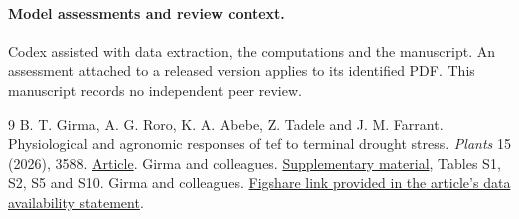 \documentclass[11pt]{article}
\begin{document}
\paragraph{Model assessments and review context.} Codex assisted with data extraction, the computations and the manuscript. An assessment attached to a released version applies to its identified PDF. This manuscript records no independent peer review.

\begin{thebibliography}{9}
 B. T. Girma, A. G. Roro, K. A. Abebe, Z. Tadele and J. M. Farrant. Physiological and agronomic responses of tef to terminal drought stress. \emph{Plants} 15 (2026), 3588. \href{https://doi.org/10.3390/plants15223588}{Article}.
 Girma and colleagues. \href{https://mdpi-res.com/d_attachment/plants/plants-15-03588/article_deploy/plants-15-03588-s001.zip}{Supplementary material}, Tables S1, S2, S5 and S10.
 Girma and colleagues. \href{https://figshare.com/s/0568883f232686727719}{Figshare link provided in the article's data availability statement}.
\end{thebibliography}
\end{document}
